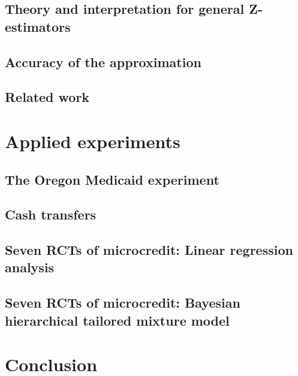 \documentclass[webpdf,contemporary,small,namedate]{oup-authoring-template}%
\theoremstyle{thmstyleone}%
\begin{document}
    \subsection{Theory and interpretation for general Z-estimators}
    

    \subsection{Accuracy of the approximation}
    

    \subsection{Related work}
    


\section{Applied experiments} 

    \subsection{The Oregon Medicaid experiment}
    

    \subsection{Cash transfers}
    

    \subsection{Seven RCTs of microcredit: Linear regression analysis}
    

    \subsection{Seven RCTs of microcredit: Bayesian hierarchical tailored mixture model}
    


\section{Conclusion}

\end{document}
